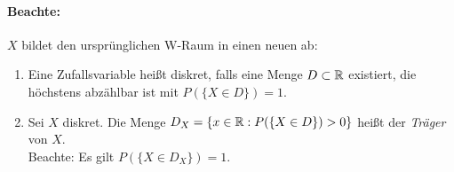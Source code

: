 
\paragraph{Beachte:}
$X$ bildet den ursprünglichen W-Raum in einen neuen ab:
\begin{center}
\end{center}

\begin{definition}
    \begin{enumerate}
        \item Eine Zufallsvariable heißt diskret, falls eine Menge $D \subset \mathbb{R}$
              existiert, die höchstens abzählbar ist mit $P(\{X \in D\})=1$.
        \item Sei $X$ diskret. Die Menge $D_X = \{ x \in \mathbb{R}: P(\{X \in D\})>0 \}$
              heißt der \emph{Träger} von $X$.\\
              Beachte: Es gilt $P(\{X \in D_X \}) = 1$.
    \end{enumerate}
\end{definition}

